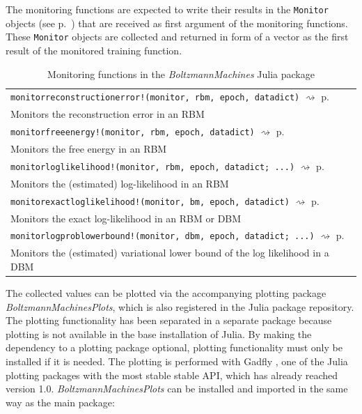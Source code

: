 \documentclass[12pt]{article}
\newcommand{\inlinecode}[1]{\texttt{#1}}
\newcommand{\apkg}[1]{\emph{#1}}
\newcommand{\rightpageref}[1]{\hfill $\rightsquigarrow$ p.\ \pageref{#1}}
\begin{document}
The monitoring functions are expected to write their results in the \inlinecode{Monitor} objects (see p.\ \pageref{bms_Monitor}) that are received as first argument of the monitoring functions.
These \inlinecode{Monitor} objects are collected and returned in form of a vector as the first result of the monitored training function.

\begin{table}[h]
   \begin{tabularx}{\textwidth}{X}
   \hline
   \inlinecode{monitorreconstructionerror!(monitor, rbm, epoch, datadict)} \rightpageref{bms_monitorreconstructionerror!}\\
     Monitors the reconstruction error in an RBM \\
     \inlinecode{monitorfreeenergy!(monitor, rbm, epoch, datadict)} \rightpageref{bms_monitorfreeenergy!}\\ 
Monitors the free energy in an RBM \\
     \inlinecode{monitorloglikelihood!(monitor, rbm, epoch, datadict; ...)} \rightpageref{bms_monitorloglikelihood!}\\ 
Monitors the (estimated) log-likelihood in an RBM \\
        \inlinecode{monitorexactloglikelihood!(monitor, bm, epoch, datadict)} \rightpageref{bms_monitorexactloglikelihood!}\\ 
Monitors the exact log-likelihood in an RBM or DBM \\
     \inlinecode{monitorlogproblowerbound!(monitor, dbm, epoch, datadict; ...)} \rightpageref{bms_monitorlogproblowerbound!}\\
  Monitors the (estimated) variational lower bound of the log likelihood in a DBM \\
   \hline
\end{tabularx}
\caption{Monitoring functions in the \apkg{BoltzmannMachines} Julia package}
\label{monfun}
\end{table}

The collected values can be plotted via the accompanying plotting package \apkg{Boltzmann\-Machines\-Plots}, which is also registered in the Julia package repository.
The plotting functionality has been separated in a separate package because plotting is not available in the base installation of Julia.
By making the dependency to a plotting package optional, plotting functionality must only be installed if it is needed.
The plotting is performed with Gadfly \citep{gadfly}, one of the Julia plotting packages with the most stable stable API, which has already reached version 1.0.
\apkg{BoltzmannMachinesPlots} can be installed and imported in the same way as the main package:
\end{document}
